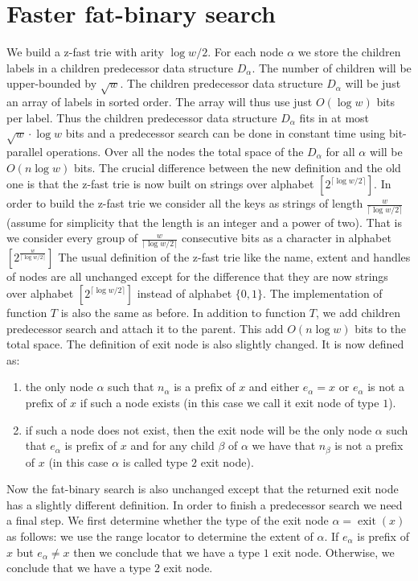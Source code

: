 \documentclass[11pt]{llncs}
\newcommand{\exit}[1]{\operatorname{exit}(#1)}
\begin{document}
\section{Faster fat-binary search}
We build a z-fast trie with arity $\log w/2$. For each node $\alpha$ we store the children labels in a children predecessor data structure $D_\alpha$. The number of children will be upper-bounded by $\sqrt{w}$. The children predecessor data structure $D_\alpha$ will be just an array of labels in sorted order. The array will thus use just $O(\log w)$ bits per label. 
Thus the children predecessor data structure $D_\alpha$ fits in at most $\sqrt{w}\cdot {\log w}$ bits and a predecessor search can be done in constant time using bit-parallel operations. Over all the nodes the total space of the $D_\alpha$ for all $\alpha$ will be $O(n\log w)$ bits. 
The crucial difference between the new definition and the old one is that the z-fast trie is now built on strings over alphabet $[2^{\lceil\log w/2\rceil}]$. In order to build the z-fast trie we consider all the keys as strings of length $\frac{w}{\lceil\log w/2\rceil}$ (assume for simplicity that the length is an integer and a power of two). That is we consider every group of $\frac{w}{\lceil\log w/2\rceil}$ consecutive bits as a character in alphabet $[2^{\frac{w}{\lceil\log w/2\rceil}}]$
The usual definition of the z-fast trie like the name, extent and handles of nodes are all unchanged except for the difference that they are now strings over alphabet $[2^{\lceil\log w/2\rceil}]$ instead of alphabet $\{0,1\}$. The implementation of function $T$ is also the same as before. In addition to function $T$, we add children predecessor search and attach it to the parent. This add $O(n\log w)$ bits to the total space. 
The definition of exit node is also slightly changed. It is now defined as:
\begin{enumerate}
\item the only node $\alpha$ such that $n_\alpha$ is a prefix of $x$ and either $e_\alpha=x$ or $e_\alpha$ is not a prefix of $x$ if such a node exists (in this case we call it exit node of type $1$). 
\item if such a node does not exist, then the exit node will be the only node $\alpha$ such that $e_\alpha$ is prefix of $x$ and for any child $\beta$ of $\alpha$ we have that $n_\beta$ is not a prefix of $x$ (in this case $\alpha$ is called type $2$ exit node). 
\end{enumerate}
Now the fat-binary search is also unchanged except that the returned exit node has a slightly different definition. In order to finish a predecessor search we need a final step. We first determine whether the type of the exit node $\alpha=\exit x$ as follows: we use the range locator to determine the extent of $\alpha$. If $e_\alpha$ is prefix of $x$ but $e_\alpha\neq x$ then we conclude that we have a type $1$ exit node. Otherwise, we conclude that we have a type $2$ exit node. 
\end{document}
